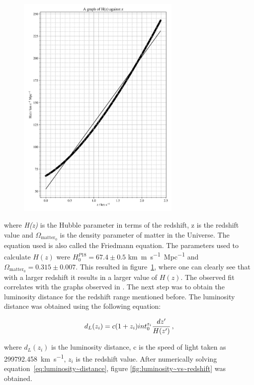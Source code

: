 \documentclass[12pt, a4paper]{article}
\begin{document}
\begin{figure}[H]
    \centering
    \includegraphics[width = 0.7\textwidth]{Graph 1.png}
    \label{fig:Hz~vs~redshift}
\end{figure}

where \textit{H(z)} is the Hubble parameter in terms of the redshift, z is the redshift value and \(\Omega_{\mathrm{matter_0}}\) is the density parameter of matter in the Universe. The equation used is also called the Friedmann equation. The parameters used to calculate \(H(z)\) were \(H_0^{P18} = 67.4 \pm 0.5\) \unit{km.m.s^{-1}.Mpc^{-1}} and \(\Omega_{\mathrm{matter_0}} = 0.315 \pm 0.007\). This resulted in figure~\ref{fig:Hz~vs~redshift}, where one can clearly see that with a larger redshift it results in a larger value of \(H(z)\). The observed fit correlates with the graphs observed in \parencite{hubble}. The next step was to obtain the luminosity distance for the redshift range mentioned before. The luminosity distance was obtained using the following equation:

\begin{equation}
    d_L(z_i) = c(1+z_i)\\int_{0}^{z_i} \frac{dz'}{H(z')}\,,
    \label{eq:luminosity~distance}
\end{equation}

where \(d_L(z_i)\) is the luminosity distance, c is the speed of light taken as \qty{299792.458}{km.s^{-1}}, \(z_i\) is the redshift value. After numerically solving equation~\ref{eq:luminosity~distance}, figure \ref{fig:luminosity~vs~redshift} was obtained.
\end{document}
